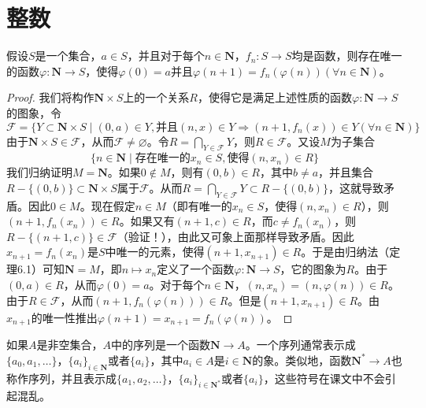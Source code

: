 \documentclass[../../main.tex]{subfiles}
\begin{document}
\section{整数}

\begin{theorem}[逆归定理]\label{theorem:逆归定理}
假设$S$是一个集合，$a \in S$，并且对于每个$n \in \boldsymbol{N}$，$f_n: S \to S$均是函数，则存在唯一的函数$\varphi: \boldsymbol{N} \to S$，使得$\varphi(0) = a$并且$\varphi(n + 1) = f_n(\varphi(n)) (\forall n \in \boldsymbol{N})$。
\end{theorem}
\begin{proof}
我们将构作$\boldsymbol{N} \times S$上的一个关系$R$，使得它是满足上述性质的函数$\varphi: \boldsymbol{N} \to S$的图象，令
\[
\mathcal{F} = \{ Y \subset \boldsymbol{N} \times S \mid (0, a) \in Y, \text{并且} (n, x) \in Y \Rightarrow (n + 1, f_n(x)) \in Y (\forall n \in \boldsymbol{N}) \}
\]
由于$\boldsymbol{N} \times S \in \mathcal{F}$，从而$\mathcal{F} \neq \varnothing$。令$R = \bigcap_{Y \in \mathcal{F}} Y$，则$R \in \mathcal{F}$。又设$M$为子集合
\[
\{ n \in \boldsymbol{N} \mid \text{存在唯一的} x_n \in S, \text{使得} (n, x_n) \in R \}
\]
我们归纳证明$M = \boldsymbol{N}$。如果$0 \notin M$，则有$(0, b) \in R$，其中$b \neq a$，并且集合$R - \{ (0, b) \} \subset \boldsymbol{N} \times S$属于$\mathcal{F}$。从而$R = \bigcap_{Y \in \mathcal{F}} Y \subset R - \{ (0, b) \}$，这就导致矛盾。因此$0 \in M$。现在假定$n \in M$（即有唯一的$x_n \in S$，使得$(n, x_n) \in R$），则$(n + 1, f_n(x_n)) \in R$。如果又有$(n + 1, c) \in R$，而$c \neq f_n(x_n)$，则$R - \{ (n + 1, c) \} \in \mathcal{F}$（验证！），由此又可象上面那样导致矛盾。因此$x_{n + 1} = f_n(x_n)$是$S$中唯一的元素，使得$(n + 1, x_{n + 1}) \in R$。于是由归纳法（定理6.1）可知$\boldsymbol{N} = M$，即$n \longmapsto x_n$定义了一个函数$\varphi: \boldsymbol{N} \to S$，它的图象为$R$。由于$(0, a) \in R$，从而$\varphi(0) = a$。对于每个$n \in \boldsymbol{N}$，$(n, x_n) = (n, \varphi(n)) \in R$。由于$R \in \mathcal{F}$，从而$(n + 1, f_n(\varphi(n))) \in R$。但是$(n + 1, x_{n + 1}) \in R$。由$x_{n + 1}$的唯一性推出$\varphi(n + 1) = x_{n + 1} = f_n(\varphi(n))$。

\end{proof}

\begin{remark}
如果$A$是非空集合，$A$中的序列是一个函数$\boldsymbol{N} \to A$。一个序列通常表示成$\{a_0, a_1, \dots\}$，$\{a_i\}_{i \in \boldsymbol{N}}$或者$\{a_i\}$，其中$a_i \in A$是$i \in \boldsymbol{N}$的象。类似地，函数$\boldsymbol{N}^* \to A$也称作序列，并且表示成$\{a_1, a_2, \dots\}$，$\{a_i\}_{i \in \boldsymbol{N}^*}$或者$\{a_i\}$，这些符号在课文中不会引起混乱。
\end{remark}
\end{document}
